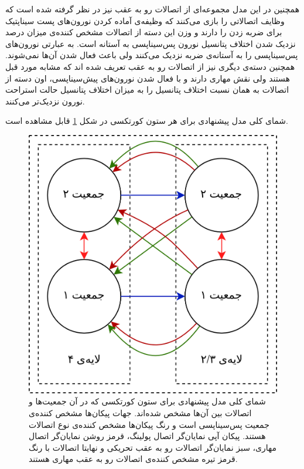 \documentclass[12pt]{report}
\begin{document}
	همچنین در این مدل مجموعه‌ای از اتصالات رو به عقب نیز در نظر گرفته شده است که وظایف اتصالاتی را بازی می‌کنند که وظیفه‌ی آماده کردن نورون‌های پست سیناپتیک برای ضربه زدن را دارند و وزن این دسته از اتصالات مشخص کننده‌ی میزان درصد نزدیک شدن اختلاف پتانسیل نورون پس‌سیناپسی به آستانه است. به عبارتی نورون‌های پس‌سیناپسی را به آستانه‌ی ضربه نزدیک می‌کنند ولی باعث فعال شدن آن‌ها نمی‌شوند. همچنین دسته‌ی دیگری نیز از اتصالات رو به عقب تعریف شده اند که مشابه مورد قبل هستند ولی نقش مهاری دارند و با فعال شدن نورون‌های پیش‌سیناپسی، اون دسته از اتصالات به همان نسبت اختلاف پتانسیل را به میزان اختلاف پتانسیل حالت استراحت نورون نزدیک‌تر می‌کنند.
	
	شمای کلی مدل پیشنهادی برای هر ستون کورتکسی در شکل \ref{fig:model_cc} قابل مشاهده است. 
	
	\begin{figure}[]
		\centering
		\includegraphics[width=1.0\linewidth]{model_cc.png}
		\caption[NS]{
			شمای کلی مدل پیشنهادی برای ستون کورتکسی که در آن جمعیت‌ها و اتصالات بین آن‌ها مشخص شده‌اند. جهات پیکان‌ها مشخص کننده‌ی جمعیت پس‌سیناپسی است و رنگ پیکان‌ها مشخص کننده‌ی نوع اتصالات هستند. پیکان آپی نمایان‌گر اتصال پولینگ، قرمز روشن نمایان‌گر اتصال مهاری، سبز نمایان‌گر اتصالات رو به عقب تحریکی و نهایتا اتصالات با رنگ قرمز تیره مشخص کننده‌ی اتصالات رو به عقب مهاری هستند.
		}
		\label{fig:model_cc} 
	\end{figure}
	
\end{document}
